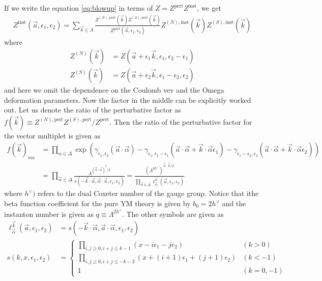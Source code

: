 \documentclass[11pt]{article}
\def\a{\alpha}
\def\g{\gamma}
\def\e{\epsilon}
\begin{document}
If we write the equation \eqref{eq:blowup} in terms of $Z = Z^{\textrm{pert}} Z^{\textrm{inst}}$, we get
\begin{align}
 Z^{\textrm{inst}}(\vec{a}, \e_1, \e_2) = \sum_{\vec{k} \in \Lambda} \frac{Z^{(N), \textrm{pert}}(\vec{k}) Z^{(S), \textrm{pert}}(\vec{k})}{Z^{\textrm{pert}}(\vec{a}, \e_1, \e_2)} Z^{(N), \textrm{inst}}(\vec{k} ) Z^{(S), \textrm{inst}}(\vec{k})
\end{align}
where
\begin{align}
 Z^{(N)} (\vec{k}) &= Z(\vec{a}+ \e_1 \vec{k}, \e_1, \e_2 - \e_1) \\
 Z^{(S)} (\vec{k}) &= Z(\vec{a} + \e_2 \vec{k}, \e_1 - \e_2, \e_2)
\end{align}
and here we omit the dependence on the Coulomb vev and the Omega deformation parameters. 
Now the factor in the middle can be explicitly worked out. Let us denote the ratio of the perturbative factor as $f(\vec{k}) \equiv Z^{(N), \textrm{pert}} Z^{(S), \textrm{pert}}/Z^{\textrm{pert}}$. 
Then the ratio of the perturbative factor for the vector multiplet is given as
\begin{align} \label{eq:1loopvec}
f(\vec{k})_{\textrm{vec}} &= \prod_{\a \in \Delta} \exp \left( \g_{\e_1, \e_2} (\vec{a}\cdot \vec{\a}) - \g_{\e_1, \e_2 - \e_1}(\vec{a}\cdot \vec{\a} + \vec{k}\cdot\vec{\a} \e_1) -  \g_{\e_1 - \e_2, \e_2 }(\vec{a}\cdot \vec{\a} +  \vec{k}\cdot\vec{\a} \e_2)   \right) \\
 &= \prod_{\vec{\a} \in \Delta}  \frac{\Lambda^{(\vec{k} \cdot \vec{\a})^2 /2} }{s(-\vec{k}\cdot \vec{\a}, \vec{\a}\cdot \vec{a}, \e_1, \e_2) }
 = \frac{(\Lambda^{2 h^\vee})^{\vec{k} \cdot \vec{k}/2} }{\prod_{\vec{\a} \in \Delta} \ell^{\vec{k}}_{\vec{\a}} (\vec{a}, \e_1, \e_2) }
\end{align}
where $h^\vee)$ refers to the dual Coxeter number of the gauge group. Notice that ithe beta function coefficient for the pure YM theory is given by $b_0 = 2h^\vee$ and the instanton number is given as $q \equiv \Lambda^{2 h^\vee}$. The other symbols are given as 
\begin{align}
\ell^{\vec{k}}_{\vec{\alpha}} (\vec{a}, \e_1, \e_2) &= s(-\vec{k}\cdot\vec{\a}, \vec{a}\cdot\vec{\a}, \e_1, \e_2) \\
s(k, x, \e_1, \e_2) &= 
\begin{cases}
 {\displaystyle \prod_{i, j \ge 0, i+j \le k-1} (x - i \e_1 - j e_2) } & (k > 0) \\
 {\displaystyle \prod_{i, j \ge 0, i+j \le -k-2} (x + (i+1)\e_1 + (j+1)\e_2)} & (k < -1)  \\
 1 & (k=0, -1)
\end{cases}
\end{align}
\end{document}
